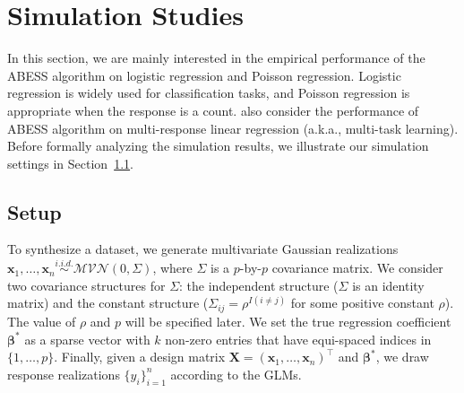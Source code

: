 \section{Simulation Studies}\label{sec:simulation}
In this section, we are mainly interested in the empirical performance of the ABESS algorithm on logistic regression and Poisson regression.
Logistic regression is widely used for classification tasks, and Poisson regression is appropriate when the response is a count.
\fi
also consider the performance of ABESS algorithm on multi-response linear regression (a.k.a., multi-task learning).
Before formally analyzing the simulation results,
we illustrate our simulation settings in Section~\ref{subsec:setup}.


\subsection{Setup}\label{subsec:setup}
To synthesize a dataset, we generate multivariate Gaussian realizations $\boldsymbol{x}_1, \ldots, \boldsymbol{x}_n \overset{i.i.d.}{\sim} \mathcal{MVN}(0,\Sigma)$,
where $\Sigma$ is a $p$-by-$p$ covariance matrix.
We consider two covariance structures for $\Sigma$: the independent structure ($\Sigma$ is an identity matrix)
and the constant structure ($\Sigma_{ij} = \rho^{I(i\neq j)}$ for some positive constant $\rho$). The value of $\rho$ and $p$ will be specified later.
We set the true regression coefficient $\boldsymbol{\beta}^*$ as a sparse vector with $k$ non-zero entries that have equi-spaced indices in $\{1, \ldots, p\}$.
Finally, given a design matrix $\mathbf{X} = (\boldsymbol{x}_1, \ldots, \boldsymbol{x}_n)^\top$ and $\boldsymbol{\beta}^*$,
we draw response realizations $\{y_i\}_{i=1}^n$ according to the GLMs.

